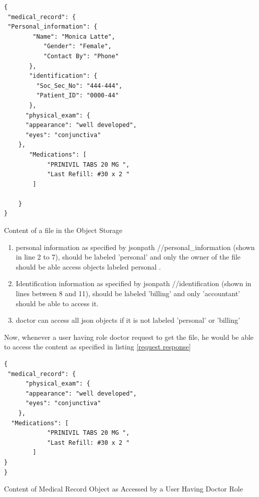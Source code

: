 \begin{listing}
\begin{verbatim}
{
 "medical_record": {
 "Personal_information": {
	    "Name": "Monica Latte",              
           "Gender": "Female",
           "Contact By": "Phone"
       },
       "identification": {
         "Soc_Sec_No": "444-444",
         "Patient_ID": "0000-44"
       },
      "physical_exam": {
	  "appearance": "well developed",
	  "eyes": "conjunctiva"
	},
       "Medications": [
            "PRINIVIL TABS 20 MG ",
            "Last Refill: #30 x 2 "
        ]    
      
    }
}

\end{verbatim}
\caption{Content of a file in the Object Storage} 
\label{patient Record}
\end{listing}

\begin{enumerate}

  \item  personal information as specified by jsonpath //personal\_information (shown in line 2 to 7), should be labeled 'personal' and only the owner of the file should be able access objects labeled personal .

  \item Identification information as specified by jsonpath //identification (shown in lines between 8 and 11), should be labeled 'billing' and only 'accountant' should be able to access it.

  \item  doctor  can access all json objects if it is not labeled 'personal' or 'billing'
\end{enumerate}

Now, whenever a user having role doctor request to get the file, he would be able to access the content as specified in listing \ref{request response} 

\begin{listing}
\begin{verbatim}
{
 "medical_record": { 
      "physical_exam": {
	  "appearance": "well developed",
	  "eyes": "conjunctiva"
	},
  "Medications": [
            "PRINIVIL TABS 20 MG ",
            "Last Refill: #30 x 2 "
        ]   
}  
}

\end{verbatim}
\caption{Content of  Medical Record Object as Accessed by a User Having Doctor Role} 
\label{request response}
\end{listing}

